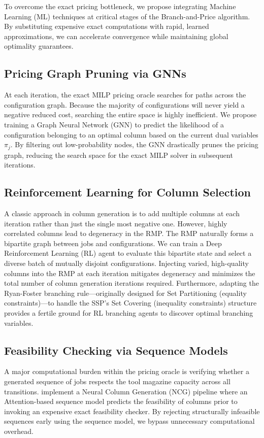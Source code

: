 \documentclass[12pt]{article}
\begin{document}
	To overcome the exact pricing bottleneck, we propose integrating Machine Learning (ML) techniques at critical stages of the Branch-and-Price algorithm. By substituting expensive exact computations with rapid, learned approximations, we can accelerate convergence while maintaining global optimality guarantees.
	
	\subsection{Pricing Graph Pruning via GNNs}
	At each iteration, the exact MILP pricing oracle searches for paths across the configuration graph. Because the majority of configurations will never yield a negative reduced cost, searching the entire space is highly inefficient. We propose training a Graph Neural Network (GNN) to predict the likelihood of a configuration belonging to an optimal column based on the current dual variables $\pi_j$. By filtering out low-probability nodes, the GNN drastically prunes the pricing graph, reducing the search space for the exact MILP solver in subsequent iterations.
	
	\subsection{Reinforcement Learning for Column Selection}
	A classic approach in column generation is to add multiple columns at each iteration rather than just the single most negative one. However, highly correlated columns lead to degeneracy in the RMP. The RMP naturally forms a bipartite graph between jobs and configurations. We can train a Deep Reinforcement Learning (RL) agent to evaluate this bipartite state and select a diverse batch of mutually disjoint configurations. Injecting varied, high-quality columns into the RMP at each iteration mitigates degeneracy and minimizes the total number of column generation iterations required. Furthermore, adapting the Ryan-Foster branching rule---originally designed for Set Partitioning (equality constraints)---to handle the SSP's Set Covering (inequality constraints) structure provides a fertile ground for RL branching agents to discover optimal branching variables.
	
	\subsection{Feasibility Checking via Sequence Models}
	A major computational burden within the pricing oracle is verifying whether a generated sequence of jobs respects the tool magazine capacity across all transitions. \citet{Xia2024} implement a Neural Column Generation (NCG) pipeline where an Attention-based sequence model predicts the feasibility of columns prior to invoking an expensive exact feasibility checker. By rejecting structurally infeasible sequences early using the sequence model, we bypass unnecessary computational overhead.
	
\end{document}
